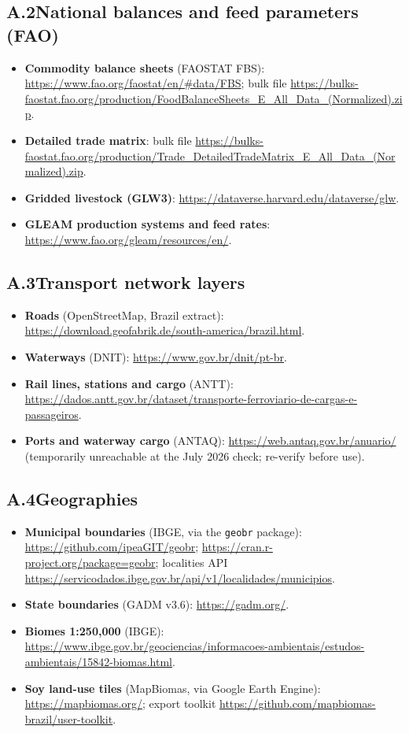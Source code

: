 \subsection*{A.2\quad National balances and feed parameters (FAO)}
\begin{itemize}
  \item \textbf{Commodity balance sheets} (FAOSTAT FBS):
    \url{https://www.fao.org/faostat/en/#data/FBS}; bulk file
    \url{https://bulks-faostat.fao.org/production/FoodBalanceSheets_E_All_Data_(Normalized).zip}.
  \item \textbf{Detailed trade matrix}: bulk file
    \url{https://bulks-faostat.fao.org/production/Trade_DetailedTradeMatrix_E_All_Data_(Normalized).zip}.
  \item \textbf{Gridded livestock (GLW3)}:
    \url{https://dataverse.harvard.edu/dataverse/glw}.
  \item \textbf{GLEAM production systems and feed rates}:
    \url{https://www.fao.org/gleam/resources/en/}.
\end{itemize}

\subsection*{A.3\quad Transport network layers}
\begin{itemize}
  \item \textbf{Roads} (OpenStreetMap, Brazil extract):
    \url{https://download.geofabrik.de/south-america/brazil.html}.
  \item \textbf{Waterways} (DNIT): \url{https://www.gov.br/dnit/pt-br}.
  \item \textbf{Rail lines, stations and cargo} (ANTT):
    \url{https://dados.antt.gov.br/dataset/transporte-ferroviario-de-cargas-e-passageiros}.
  \item \textbf{Ports and waterway cargo} (ANTAQ):
    \url{https://web.antaq.gov.br/anuario/} (temporarily unreachable at
    the July 2026 check; re-verify before use).
\end{itemize}

\subsection*{A.4\quad Geographies}
\begin{itemize}
  \item \textbf{Municipal boundaries} (IBGE, via the \texttt{geobr}
    package): \url{https://github.com/ipeaGIT/geobr};
    \url{https://cran.r-project.org/package=geobr}; localities API
    \url{https://servicodados.ibge.gov.br/api/v1/localidades/municipios}.
  \item \textbf{State boundaries} (GADM v3.6): \url{https://gadm.org/}.
  \item \textbf{Biomes 1:250{,}000} (IBGE):
    \url{https://www.ibge.gov.br/geociencias/informacoes-ambientais/estudos-ambientais/15842-biomas.html}.
  \item \textbf{Soy land-use tiles} (MapBiomas, via Google Earth Engine):
    \url{https://mapbiomas.org/}; export toolkit
    \url{https://github.com/mapbiomas-brazil/user-toolkit}.
\end{itemize}

